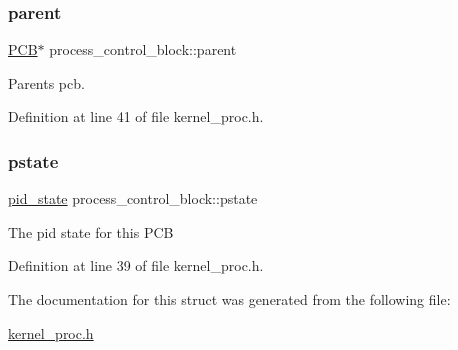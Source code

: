 \subsubsection{\texorpdfstring{parent}{parent}}
{\footnotesize\ttfamily \hyperlink{group__proc_gadf327f09ee935cf1734c14e8849f0421}{P\+CB}$\ast$ process\+\_\+control\+\_\+block\+::parent}

Parent\textquotesingle{}s pcb. 

Definition at line 41 of file kernel\+\_\+proc.\+h.

\mbox{\label{structprocess__control__block_ae3334dd8a5747f108124c7129c27eea5}} 
\subsubsection{\texorpdfstring{pstate}{pstate}}
{\footnotesize\ttfamily \hyperlink{group__proc_gade1eea4d20492c4c97263201145e5097}{pid\+\_\+state} process\+\_\+control\+\_\+block\+::pstate}

The pid state for this P\+CB 

Definition at line 39 of file kernel\+\_\+proc.\+h.



The documentation for this struct was generated from the following file\+:\begin{DoxyCompactItemize}
\item 
\hyperlink{kernel__proc_8h}{kernel\+\_\+proc.\+h}\end{DoxyCompactItemize}
